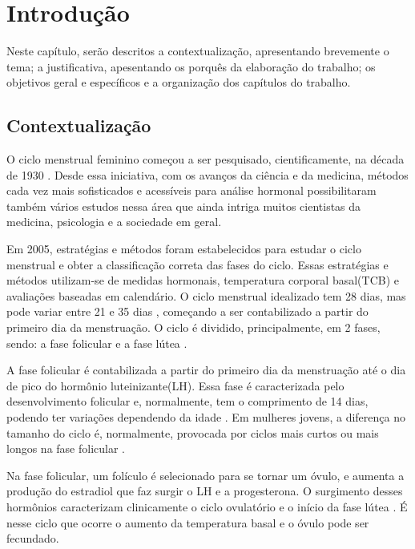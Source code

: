 \chapter[Introdução]{Introdução}

Neste capítulo, serão descritos a contextualização, apresentando brevemente o tema; a justificativa, apesentando os porquês da elaboração do trabalho; os objetivos geral e específicos e a organização dos capítulos do trabalho.

\section{Contextualização}

O ciclo menstrual feminino começou a ser pesquisado, cientificamente, na década de 1930 \cite{frank1931}.
Desde essa iniciativa, com os avanços da ciência e da medicina, métodos cada vez mais sofisticados e 
acessíveis para análise hormonal possibilitaram também vários estudos nessa área que ainda intriga 
muitos cientistas da medicina, psicologia e a sociedade em geral.


Em 2005, estratégias e métodos foram estabelecidos para estudar o ciclo menstrual e obter a 
classificação correta das fases do ciclo\cite{becker2005}.
Essas estratégias e métodos utilizam-se de medidas hormonais, temperatura corporal basal(TCB) e 
avaliações baseadas em calendário. O ciclo menstrual idealizado tem 28 dias, mas pode variar entre 21 
e 35 dias \cite{lenton1984a}, começando a ser contabilizado a partir do primeiro dia da menstruação. 
O ciclo é dividido, principalmente, em 2 fases, sendo: a fase folicular e a fase lútea 
\cite{brondin2008}.


A fase folicular é contabilizada a partir do primeiro dia da menstruação até o dia de pico do hormônio 
luteinizante(LH). Essa fase é caracterizada pelo desenvolvimento folicular e, normalmente, tem o comprimento de 14 
dias, podendo ter variações dependendo da idade \cite{lenton1984a}. Em mulheres jovens, a diferença no 
tamanho do ciclo é, normalmente, provocada por ciclos mais curtos ou mais longos na fase folicular \cite{lenton1984a}.


Na fase folicular, um folículo é selecionado para se tornar um óvulo, e aumenta a produção do estradiol
que faz surgir o LH e a progesterona. O surgimento desses hormônios caracterizam clinicamente o ciclo 
ovulatório e o início da fase lútea \cite{fritz2010}. É nesse ciclo que ocorre o aumento da temperatura
basal e o óvulo pode ser fecundado. 


